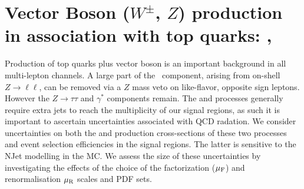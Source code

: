 \begin{table}
{
\label{table:background_summary}
}
\end{table} 


\section{Vector Boson ($W^{\pm}$, $Z$) production in association with top quarks: \ttV, \tZ}  
\label{section:ttV}
Production of top quarks plus vector boson is an important background in all multi-lepton channels.   A large part of the \ttV\ component, arising from on-shell $Z\to\ell\ell$, can be removed via a $Z$ mass veto on like-flavor, opposite sign leptons.  However the $Z \to \tau\tau$ and $\gamma^*$ components remain. The \ttW and \tZ processes generally require extra jets to reach the multiplicity of our signal regions, as such it is important to ascertain uncertainties associated with QCD radation. We consider uncertainties on both the \ttW and \ttZ production cross-sections of these two processes and event selection efficiencies in the signal regions. The latter is sensitive to the NJet modelling in the MC. We assess the size of these uncertainties by investigating the effects of the choice of the factorization ($\mu_{\rm F}$) and renormalisation $\mu_{\rm R}$ scales and PDF sets. 

